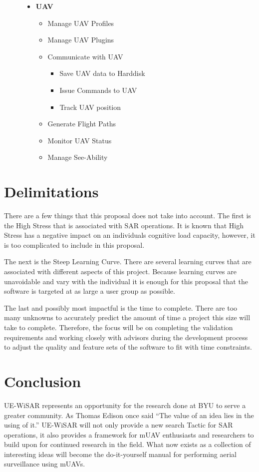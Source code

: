 \documentclass[12pt]{IEEEtran}
\begin{document}
\begin{figure}[htp]
\begin{itemize}
		\item \textbf{UAV}
		\begin{itemize}
		  	\item Manage UAV Profiles
		  	\item Manage UAV Plugins
		  	\item Communicate with UAV
		  	\begin{itemize}
		  	  	\item Save UAV data to Harddisk
		  	  	\item Issue Commands to UAV
		  	  	\item Track UAV position
	  	  	\end{itemize}
	  	  	\item Generate Flight Paths
	  	  	\item Monitor UAV Status
	  	  	\item Manage See-Ability
		\end{itemize}
	\end{itemize}
	
	\label{fig:serverrequirements}
\end{figure}
\section{Delimitations}
There are a few things that this proposal does not take into account.  The first
is the High Stress that is associated with SAR operations.  It is known that
High Stress has a negative impact on an individuals cognitive load capacity,
however, it is too complicated to include in this proposal.  

The next is the
Steep Learning Curve.  There are several learning curves that are associated
with different aspects of this project.  Because learning curves are unavoidable
and vary with the individual it is enough for this proposal that the software is
targeted at as large a user group as possible.

The last and possibly most impactful is the time to complete.  There are too
many unknowns to accurately predict the amount of time a project this size will
take to complete.  Therefore, the focus will be on completing the validation
requirements and working closely with advisors during the development process to
adjust the quality and feature sets of the software to fit with time
constraints.

\section{Conclusion}
UE-WiSAR represents an opportunity for the research done at BYU to serve a
greater community.  As Thomas Edison once said ``The value of an idea lies in
the using of it.''  UE-WiSAR will not only provide a new search Tactic for
SAR operations, it also provides a framework for mUAV enthusiasts and
researchers to build upon for continued research in the field.  What now exists
as a collection of interesting ideas will become the do-it-yourself manual for
performing aerial surveillance using mUAVs.  
\end{document}
